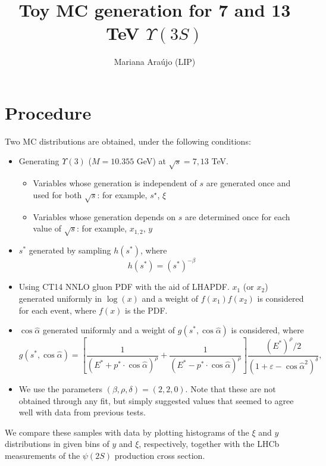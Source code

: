 \documentclass{article}
\begin{document}
\title{Toy MC generation for 7 and 13 TeV $\Upsilon(3S)$}
\author{Mariana Ara\'ujo (LIP)}
\maketitle

\section{Procedure}

Two MC distributions are obtained, under the following conditions:
\begin{itemize}
\item Generating $\Upsilon(3)$ ($M=10.355$ GeV) at $\sqrt{s}=7,13$ TeV.
\begin{itemize}
\item Variables whose generation is independent of $s$ are generated once and used for both $\sqrt{s}$: for example, $s^\star$, $\xi$
\item Variables whose generation depends on $s$ are determined once for each value of $\sqrt{s}$: for example, $x_{1,2}$, $y$
\end{itemize}
\item $s^*$ generated by sampling $h(s^*)$, where
$$ h(s^*) = \left(s^*\right)^{-\beta}$$
\item Using CT14 NNLO gluon PDF with the aid of LHAPDF. $x_1$ (or $x_2$) generated uniformly in $\log(x)$ and a weight of $f(x_1)f(x_2)$ is considered for each event, where $f(x)$ is the PDF.
\item $\cos\hat\alpha$ generated uniformly and a weight of $g(s^*, \cos\hat\alpha)$ is considered, where
$$g(s^*, \cos\hat\alpha) = \left[\frac{1}{(E^*+p^*\cdot\cos\hat\alpha)^\rho}+\frac{1}{(E^*-p^*\cdot\cos\hat\alpha)^\rho}\right]\frac{(E^*)^\rho/2}{(1+\varepsilon-\cos\hat\alpha^2)^\delta},$$
\item We use the parameters $(\beta, \rho, \delta) = (2, 2, 0)$. Note that these are not obtained through any fit, but simply suggested values that seemed to agree well with data from previous tests.
\end{itemize}

We compare these samples with data by plotting histograms of the $\xi$ and $y$ distributions in given bins of $y$ and $\xi$, respectively, together with the LHCb measurements of the $\psi(2S)$ production cross section.
\end{document}
